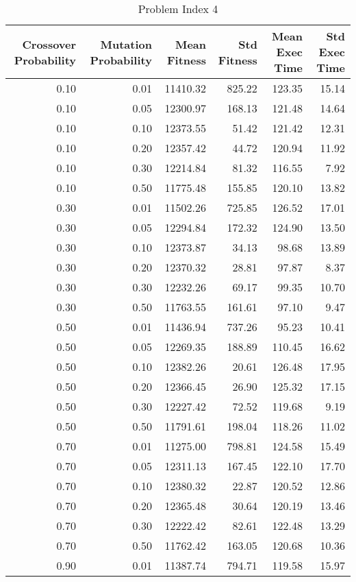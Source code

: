 \begin{table}
\caption{Problem Index 4}
\label{tab:problem_4}
\begin{tabular}{rrrrrr}
\toprule
Crossover Probability & Mutation Probability & Mean Fitness & Std Fitness & Mean Exec Time & Std Exec Time \\
\midrule
0.10 & 0.01 & 11410.32 & 825.22 & 123.35 & 15.14 \\
0.10 & 0.05 & 12300.97 & 168.13 & 121.48 & 14.64 \\
0.10 & 0.10 & 12373.55 & 51.42 & 121.42 & 12.31 \\
0.10 & 0.20 & 12357.42 & 44.72 & 120.94 & 11.92 \\
0.10 & 0.30 & 12214.84 & 81.32 & 116.55 & 7.92 \\
0.10 & 0.50 & 11775.48 & 155.85 & 120.10 & 13.82 \\
0.30 & 0.01 & 11502.26 & 725.85 & 126.52 & 17.01 \\
0.30 & 0.05 & 12294.84 & 172.32 & 124.90 & 13.50 \\
0.30 & 0.10 & 12373.87 & 34.13 & 98.68 & 13.89 \\
0.30 & 0.20 & 12370.32 & 28.81 & 97.87 & 8.37 \\
0.30 & 0.30 & 12232.26 & 69.17 & 99.35 & 10.70 \\
0.30 & 0.50 & 11763.55 & 161.61 & 97.10 & 9.47 \\
0.50 & 0.01 & 11436.94 & 737.26 & 95.23 & 10.41 \\
0.50 & 0.05 & 12269.35 & 188.89 & 110.45 & 16.62 \\
0.50 & 0.10 & 12382.26 & 20.61 & 126.48 & 17.95 \\
0.50 & 0.20 & 12366.45 & 26.90 & 125.32 & 17.15 \\
0.50 & 0.30 & 12227.42 & 72.52 & 119.68 & 9.19 \\
0.50 & 0.50 & 11791.61 & 198.04 & 118.26 & 11.02 \\
0.70 & 0.01 & 11275.00 & 798.81 & 124.58 & 15.49 \\
0.70 & 0.05 & 12311.13 & 167.45 & 122.10 & 17.70 \\
0.70 & 0.10 & 12380.32 & 22.87 & 120.52 & 12.86 \\
0.70 & 0.20 & 12365.48 & 30.64 & 120.19 & 13.46 \\
0.70 & 0.30 & 12222.42 & 82.61 & 122.48 & 13.29 \\
0.70 & 0.50 & 11762.42 & 163.05 & 120.68 & 10.36 \\
0.90 & 0.01 & 11387.74 & 794.71 & 119.58 & 15.97 \\

\end{tabular}
\end{table}
